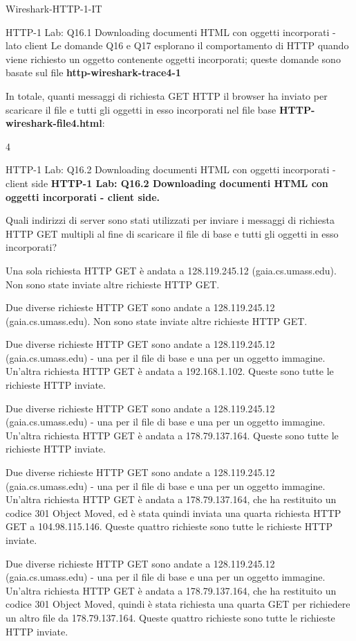 \documentclass[a4paper]{article}
\begin{document}
\begin{quiz}{Wireshark-HTTP-1-IT}
\begin{shortanswer}[points=1]{HTTP-1 Lab: Q16.1 Downloading documenti HTML con oggetti incorporati - lato client}
Le domande Q16 e Q17 esplorano il comportamento di HTTP quando viene richiesto un oggetto contenente oggetti incorporati; queste domande sono basate sul file \textbf{http-wireshark-trace4-1}

In totale, quanti messaggi di richiesta GET HTTP il browser ha inviato per scaricare il file e tutti gli oggetti in esso incorporati nel file base \textbf{HTTP-wireshark-file4.html}:
\item 4
\end{shortanswer}

\begin{multi}[points=1,shuffle]{HTTP-1 Lab: Q16.2 Downloading documenti HTML con oggetti incorporati - client side}
\textbf{HTTP-1 Lab: Q16.2 Downloading documenti HTML con oggetti incorporati - client side.}

Quali indirizzi di server sono stati utilizzati per inviare i messaggi di richiesta HTTP GET multipli al fine di scaricare il file di base e tutti gli oggetti in esso incorporati?  
\item Una sola richiesta HTTP GET è andata a 128.119.245.12 (gaia.cs.umass.edu). Non sono state inviate altre richieste HTTP GET.
\item Due diverse richieste HTTP GET sono andate a 128.119.245.12 (gaia.cs.umass.edu). Non sono state inviate altre richieste HTTP GET.
\item Due diverse richieste HTTP GET sono andate a 128.119.245.12 (gaia.cs.umass.edu) - una per il file di base e una per un oggetto immagine. Un'altra richiesta HTTP GET è andata a 192.168.1.102. Queste sono tutte le richieste HTTP inviate.
\item Due diverse richieste HTTP GET sono andate a 128.119.245.12 (gaia.cs.umass.edu) - una per il file di base e una per un oggetto immagine. Un'altra richiesta HTTP GET è andata a 178.79.137.164. Queste sono tutte le richieste HTTP inviate.
\item* Due diverse richieste HTTP GET sono andate a 128.119.245.12 (gaia.cs.umass.edu) - una per il file di base e una per un oggetto immagine. Un'altra richiesta HTTP GET è andata a 178.79.137.164, che ha restituito un codice 301 Object Moved, ed è stata quindi inviata una quarta richiesta HTTP GET a 104.98.115.146. Queste quattro richieste sono tutte le richieste HTTP inviate.
\item Due diverse richieste HTTP GET sono andate a 128.119.245.12 (gaia.cs.umass.edu) - una per il file di base e una per un oggetto immagine. Un'altra richiesta HTTP GET è andata a 178.79.137.164, che ha restituito un codice 301 Object Moved, quindi è stata richiesta una quarta GET per richiedere un altro file da 178.79.137.164. Queste quattro richieste sono tutte le richieste HTTP inviate.
\end{multi}


\end{quiz}
\end{document}
